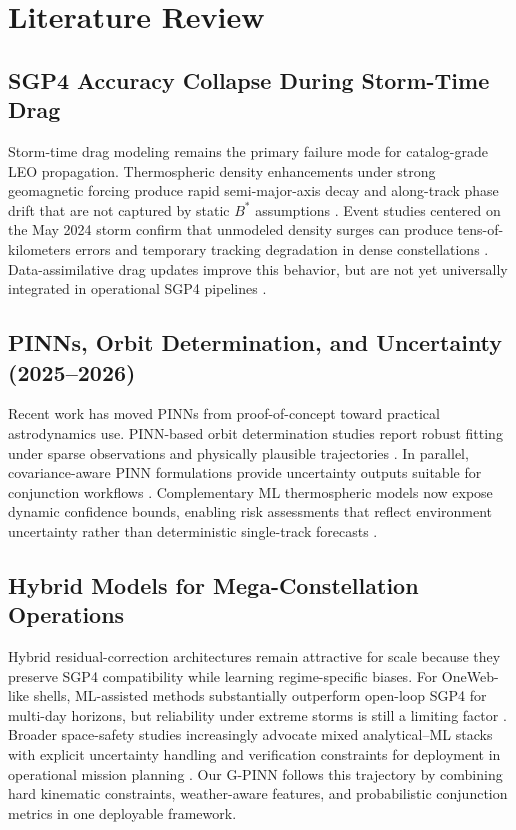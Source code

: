 \section{Literature Review}\label{sec:litreview}

\subsection{SGP4 Accuracy Collapse During Storm-Time Drag}
Storm-time drag modeling remains the primary failure mode for catalog-grade LEO propagation. Thermospheric density enhancements under strong geomagnetic forcing produce rapid semi-major-axis decay and along-track phase drift that are not captured by static $B^*$ assumptions \cite{oliveira2021current,walter2025orbital}. Event studies centered on the May 2024 storm confirm that unmodeled density surges can produce tens-of-kilometers errors and temporary tracking degradation in dense constellations \cite{parker2024satellite,kang2025solar}. Data-assimilative drag updates improve this behavior, but are not yet universally integrated in operational SGP4 pipelines \cite{dey2024improving}.

\subsection{PINNs, Orbit Determination, and Uncertainty (2025--2026)}
Recent work has moved PINNs from proof-of-concept toward practical astrodynamics use. PINN-based orbit determination studies report robust fitting under sparse observations and physically plausible trajectories \cite{loshelder2025od}. In parallel, covariance-aware PINN formulations provide uncertainty outputs suitable for conjunction workflows \cite{dallinger2025cov}. Complementary ML thermospheric models now expose dynamic confidence bounds, enabling risk assessments that reflect environment uncertainty rather than deterministic single-track forecasts \cite{li2025density,mutschler2025density}.

\subsection{Hybrid Models for Mega-Constellation Operations}
Hybrid residual-correction architectures remain attractive for scale because they preserve SGP4 compatibility while learning regime-specific biases. For OneWeb-like shells, ML-assisted methods substantially outperform open-loop SGP4 for multi-day horizons, but reliability under extreme storms is still a limiting factor \cite{chen2025oneweb,bertolini2024hybrid}. Broader space-safety studies increasingly advocate mixed analytical--ML stacks with explicit uncertainty handling and verification constraints for deployment in operational mission planning \cite{rommel2025verifiable,ramesh2025space}. Our G-PINN follows this trajectory by combining hard kinematic constraints, weather-aware features, and probabilistic conjunction metrics in one deployable framework.
